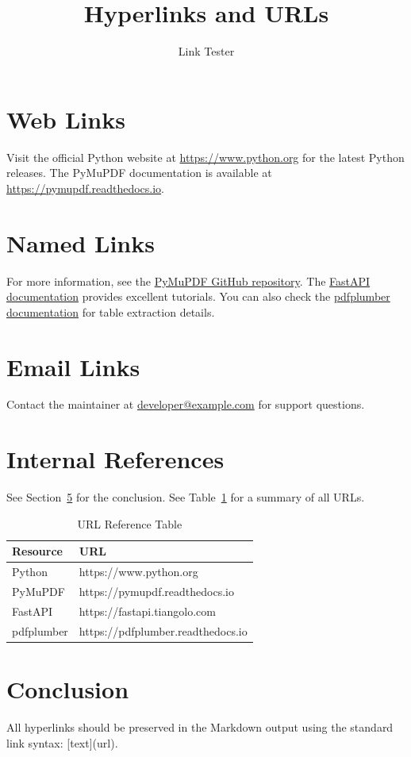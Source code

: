\documentclass[12pt]{article}
\title{Hyperlinks and URLs}
\author{Link Tester}
\begin{document}
\maketitle

\section{Web Links}
Visit the official Python website at \url{https://www.python.org} for the latest
Python releases. The PyMuPDF documentation is available at
\url{https://pymupdf.readthedocs.io}.

\section{Named Links}
For more information, see the \href{https://github.com/pymupdf/PyMuPDF}{PyMuPDF
GitHub repository}. The \href{https://fastapi.tiangolo.com}{FastAPI documentation}
provides excellent tutorials. You can also check the
\href{https://pdfplumber.readthedocs.io}{pdfplumber documentation} for table
extraction details.

\section{Email Links}
Contact the maintainer at \href{mailto:developer@example.com}{developer@example.com}
for support questions.

\section{Internal References}
See Section~\ref{sec:conclusion} for the conclusion.
See Table~\ref{tab:links} for a summary of all URLs.

\begin{table}[h]
\centering
\caption{URL Reference Table}
\label{tab:links}
\begin{tabular}{|l|l|}
\hline
\textbf{Resource} & \textbf{URL} \\
\hline
Python & https://www.python.org \\
PyMuPDF & https://pymupdf.readthedocs.io \\
FastAPI & https://fastapi.tiangolo.com \\
pdfplumber & https://pdfplumber.readthedocs.io \\
\hline
\end{tabular}
\end{table}

\section{Conclusion}
\label{sec:conclusion}
All hyperlinks should be preserved in the Markdown output using the standard
link syntax: [text](url).
\end{document}
